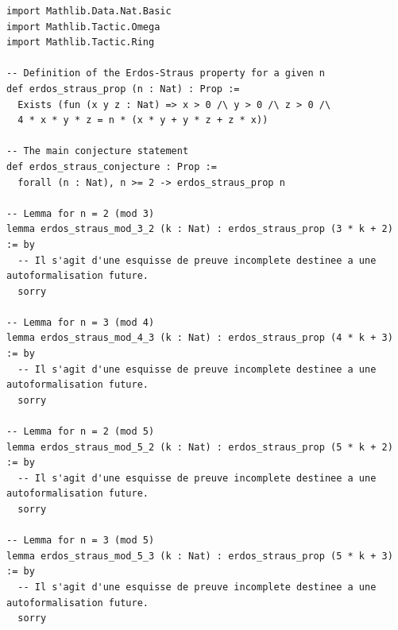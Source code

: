 \documentclass[12pt, a4paper]{article}
\theoremstyle{definition}
\theoremstyle{remark}
\begin{document}
\begin{verbatim}
import Mathlib.Data.Nat.Basic
import Mathlib.Tactic.Omega
import Mathlib.Tactic.Ring

-- Definition of the Erdos-Straus property for a given n
def erdos_straus_prop (n : Nat) : Prop :=
  Exists (fun (x y z : Nat) => x > 0 /\ y > 0 /\ z > 0 /\
  4 * x * y * z = n * (x * y + y * z + z * x))

-- The main conjecture statement
def erdos_straus_conjecture : Prop :=
  forall (n : Nat), n >= 2 -> erdos_straus_prop n

-- Lemma for n = 2 (mod 3)
lemma erdos_straus_mod_3_2 (k : Nat) : erdos_straus_prop (3 * k + 2) := by
  -- Il s'agit d'une esquisse de preuve incomplete destinee a une autoformalisation future.
  sorry

-- Lemma for n = 3 (mod 4)
lemma erdos_straus_mod_4_3 (k : Nat) : erdos_straus_prop (4 * k + 3) := by
  -- Il s'agit d'une esquisse de preuve incomplete destinee a une autoformalisation future.
  sorry

-- Lemma for n = 2 (mod 5)
lemma erdos_straus_mod_5_2 (k : Nat) : erdos_straus_prop (5 * k + 2) := by
  -- Il s'agit d'une esquisse de preuve incomplete destinee a une autoformalisation future.
  sorry

-- Lemma for n = 3 (mod 5)
lemma erdos_straus_mod_5_3 (k : Nat) : erdos_straus_prop (5 * k + 3) := by
  -- Il s'agit d'une esquisse de preuve incomplete destinee a une autoformalisation future.
  sorry
\end{verbatim}
\end{document}
